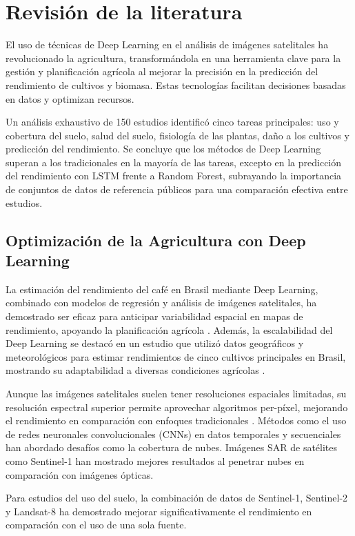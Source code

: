 \section{Revisión de la literatura}

El uso de técnicas de Deep Learning en el análisis de imágenes satelitales ha revolucionado la agricultura, transformándola en una herramienta clave para la gestión y planificación agrícola al mejorar la precisión en la predicción del rendimiento de cultivos y biomasa. Estas tecnologías facilitan decisiones basadas en datos y optimizan recursos.

Un análisis exhaustivo de 150 estudios \cite{victor2022} identificó cinco tareas principales: uso y cobertura del suelo, salud del suelo, fisiología de las plantas, daño a los cultivos y predicción del rendimiento. Se concluye que los métodos de Deep Learning superan a los tradicionales en la mayoría de las tareas, excepto en la predicción del rendimiento con LSTM frente a Random Forest, subrayando la importancia de conjuntos de datos de referencia públicos para una comparación efectiva entre estudios.


\subsection{Optimización de la Agricultura con Deep Learning}

La estimación del rendimiento del café en Brasil mediante Deep Learning, combinado con modelos de regresión y análisis de imágenes satelitales, ha demostrado ser eficaz para anticipar variabilidad espacial en mapas de rendimiento, apoyando la planificación agrícola \cite{martello2022}. Además, la escalabilidad del Deep Learning se destacó en un estudio que utilizó datos geográficos y meteorológicos para estimar rendimientos de cinco cultivos principales en Brasil, mostrando su adaptabilidad a diversas condiciones agrícolas \cite{cunha2020}.

Aunque las imágenes satelitales suelen tener resoluciones espaciales limitadas, su resolución espectral superior permite aprovechar algoritmos per-píxel, mejorando el rendimiento en comparación con enfoques tradicionales \cite{victor2022}. Métodos como el uso de redes neuronales convolucionales (CNNs) en datos temporales y secuenciales han abordado desafíos como la cobertura de nubes. Imágenes SAR de satélites como Sentinel-1 han mostrado mejores resultados al penetrar nubes en comparación con imágenes ópticas.

Para estudios del uso del suelo, la combinación de datos de Sentinel-1, Sentinel-2 y Landsat-8 ha demostrado mejorar significativamente el rendimiento en comparación con el uso de una sola fuente.

